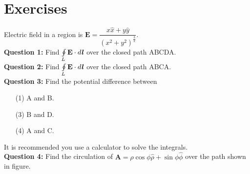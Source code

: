 \documentclass[12pt,a4paper]{article}
\begin{document}
\section{Exercises}
Electric field in a region is $\textbf{E}=\dfrac{x\hat x+y\hat y}{(x^2+y^2)^\frac{3}{2}}$.\\[0.2cm]
\noindent\textbf{Question 1:} Find $\oint\limits_L \textbf{E}\cdot d\textbf{\textit{l}}$ over the closed path ABCDA.\\[0.2cm]
\noindent\textbf{Question 2:} Find $\oint\limits_L \textbf{E}\cdot d\textbf{\textit{l}}$ over the closed path ABCA.\\[0.2cm]
\noindent\textbf{Question 3:} Find the potential difference between
\begin{itemize}
\item[(1)] A and B.
\item[(3)] B and D.
\item[(4)] A and C.
\end{itemize}
\noindent It is recommended you use a calculator to solve the integrals.\\[0.2cm]
\noindent\textbf{Question 4:} Find the circulation of $\textbf{A}=\rho \cos\phi\hat \rho+\sin\phi\hat\phi$ over the path shown in figure.\\[0.2cm]
\end{document}
